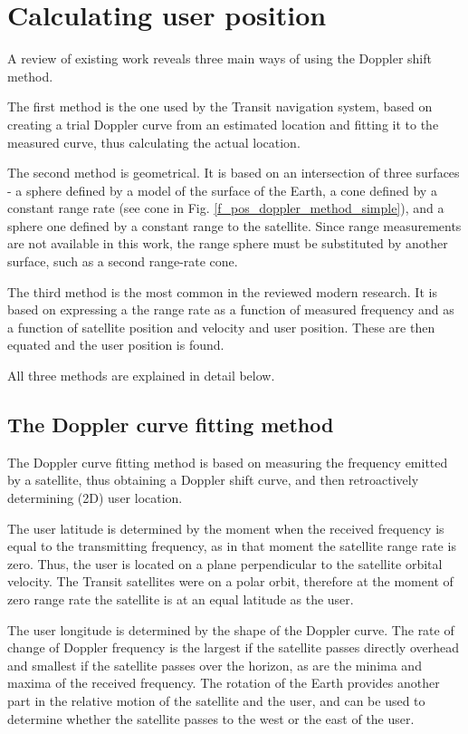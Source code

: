 \section{Calculating user position}
A review of existing work reveals three main ways of using the Doppler shift method.

The first method is the one used by the Transit navigation system, based on creating a trial Doppler curve from an estimated location and fitting it to the measured curve, thus calculating the actual location\cite{sat16}.

The second method is geometrical. It is based on an intersection of three surfaces - a sphere defined by a model of the surface of the Earth, a cone defined by a constant range rate (see cone in Fig. \ref{f_pos_doppler_method_simple}), and a sphere one defined by a constant range to the satellite\cite{sop22}. Since range measurements are not available in this work, the range sphere must be substituted by another surface, such as a second range-rate cone.

The third method is the most common in the reviewed modern research. It is based on expressing a the range rate as a function of measured frequency and as a function of satellite position and velocity and user position. These are then equated and the user position is found\cite{sop02, sop13}.

All three methods are explained in detail below.

\subsection{The Doppler curve fitting method}
\label{s_transit_nav_method}
The Doppler curve fitting method is based on measuring the frequency emitted by a satellite, thus obtaining a Doppler shift curve, and then retroactively determining (2D) user location.

The user latitude is determined by the moment when the received frequency is equal to the transmitting frequency, as in that moment the satellite range rate is zero. Thus, the user is located on a plane perpendicular to the satellite orbital velocity. The Transit satellites were on a polar orbit, therefore at the moment of zero range rate the satellite is at an equal latitude as the user.

The user longitude is determined by the shape of the Doppler curve. The rate of change of Doppler frequency is the largest if the satellite passes directly overhead and smallest if the satellite passes over the horizon, as are the minima and maxima of the received frequency. The rotation of the Earth provides another part in the relative motion of the satellite and the user, and can be used to determine whether the satellite passes to the west or the east of the user.

